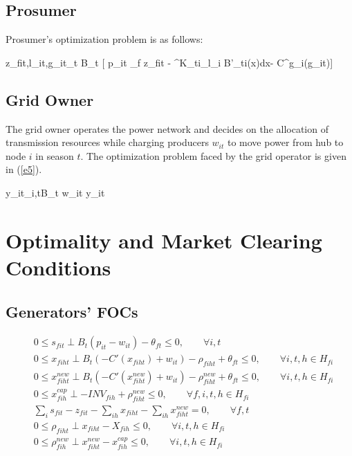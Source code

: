 \documentclass[12pt,onecolumn]{IEEEtran}
\theoremstyle{plain}
\theoremstyle{definition}
\begin{document}
\subsection{Prosumer}
Prosumer's optimization problem is as follows:

\begin{maxi!}[3]
	{z_{fit},l_{it},g_{it}}{\sum_t B_t [ p_{it} \sum_f z_{fit} - {\int^{K_{ti}}_{l_i} B'_{ti}(x)dx}- C^g_i(g_{it})]\protect\label{1a}}{\label{e1}}{}
\end{maxi!}

\subsection{Grid Owner}
The grid owner operates the power network and decides on the allocation of transmission resources while charging producers $w_{it}$ to move power from hub to node $i$ in season $t$. The optimization problem faced by the grid operator is given in (\ref{e5}). 
\begin{maxi!}[3]
	{y_{it}}{\sum_{i,t}B_t w_{it} y_{it} \protect\label{5a}}{\label{e5}}{}
\end{maxi!}


\section{Optimality and Market Clearing Conditions}

\subsection{Generators' FOCs}
\begin{subequations}\label{eq:KKT_Supply}
\begin{align}
&0 \leq s_{fit} \perp  B_t(p_{it} - w_{it}) -\theta_{ft} \leq 0, \qquad  \forall i,t  \\
&0 \leq x_{fiht} \perp B_t(-C'(x_{fiht}) + w_{it}) - \rho_{fiht} + \theta_{ft} \leq 0, \qquad \forall i,t, h \in H_{fi}  \\
&0 \leq x^{new}_{fiht} \perp B_t(- C'(x^{new}_{fiht}) + w_{it}) - \rho^{new}_{fiht} + \theta_{ft} \leq 0, \qquad \forall i,t, h \in H_{fi}  \\
& 0 \leq x^{cap}_{fih} \perp -INV_{fih} + \rho^{new}_{fiht} \leq 0, \qquad \forall f,i,t, h \in H_{fi}\\
& \sum_{i} s_{fit} - z_{fit} - \sum_{ih}x_{fiht} - \sum_{ih}x^{new}_{fiht} = 0, \qquad  \forall f,t \\
&0 \leq \rho_{fiht} \perp x_{fiht}-X_{fih} \leq 0, \qquad  \forall i,t, h \in H_{fi}\\
&0 \leq \rho^{new}_{fih} \perp x^{new}_{fiht}-x^{cap}_{fih} \leq 0, \qquad  \forall i,t, h \in H_{fi}
\end{align}
\end{subequations}
\end{document}
